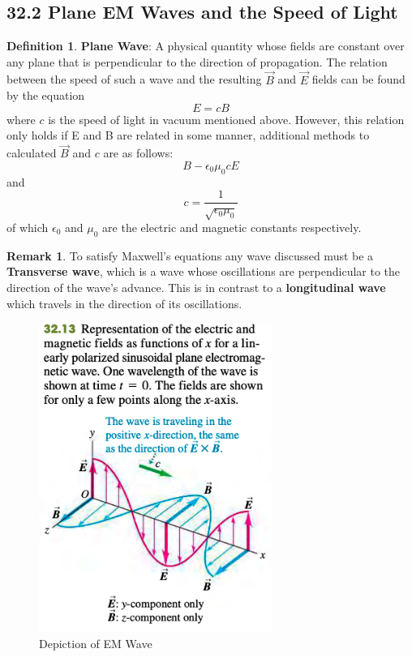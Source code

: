 \documentclass[12pt]{amsart}
\theoremstyle{definition}
\newtheorem{definition}{Definition} %
\newtheorem*{remark}{Remark}        %
\numberwithin{equation}{theorem}    %
\begin{document}
\subsection*{32.2 Plane EM Waves and the Speed of Light}



\begin{definition}
    \textbf{Plane Wave}:
    A physical quantity whose fields are constant over any plane that is perpendicular to the direction of propagation. The relation between the speed of such a wave and the resulting $\vec{B}$ and $\vec{E}$ fields can be found by the equation 
    $$E = cB$$ where $c$ is the speed of light in vacuum mentioned above.
    However, this relation only holds if E and B are related in some manner, additional methods to calculated $\vec{B}$ and $c$ are as follows:
    $$B - \epsilon_0\mu_0cE$$ and $$c = \frac{1}{\sqrt{\epsilon_0\mu_0}}$$
    of which $\epsilon_0$ and $\mu_0$ are the electric and magnetic constants respectively.
    \begin{remark}
        To satisfy Maxwell's equations any wave discussed must be a \textbf{Transverse wave}, which is a wave whose oscillations are perpendicular to the direction of the wave's advance. This is in contrast to a \textbf{longitudinal wave} which travels in the direction of its oscillations.
    \end{remark}
\end{definition}

\begin{figure}[H]
    \centering
    \includegraphics[width=3in]{Media/EM.png}
    \caption{Depiction of EM Wave}
    \label{Depiction of EM Wave}
\end{figure}
\end{document}
